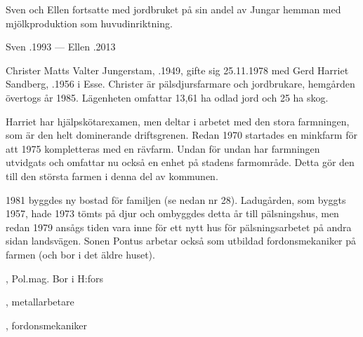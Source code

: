 Sven och Ellen fortsatte med jordbruket på sin andel av Jungar hemman med mjölkproduktion som huvudinriktning.
\begin{jhchildren}
  \item {}
  \item {}
  \item {}
\end{jhchildren}

Sven .1993  ---  Ellen .2013



%

%
Christer Matts Valter Jungerstam, .1949, gifte sig 25.11.1978 med Gerd Harriet Sandberg, .1956 i Esse. Christer är pälsdjursfarmare och jordbrukare, hemgården övertogs år 1985. Lägenheten omfattar 13,61 ha odlad jord och 25 ha skog.

Harriet har hjälpskötarexamen, men deltar i arbetet med den stora farmningen, som är den helt dominerande driftsgrenen. Redan 1970 startades en minkfarm för att 1975 kompletteras med en rävfarm. Undan för undan har farmningen utvidgats och omfattar nu också en enhet på stadens farmområde. Detta gör den till den största farmen i denna del av kommunen.


1981 byggdes ny bostad för familjen (se nedan nr 28). Ladugården, som byggts 1957, hade 1973 tömts på djur och ombyggdes detta år till pälsningshus, men redan 1979 ansågs tiden vara inne för ett nytt hus för pälsningsarbetet på andra sidan landsvägen. Sonen Pontus arbetar också som utbildad fordonsmekaniker på farmen (och bor i det äldre huset).
\begin{jhchildren}
  \item {}, Pol.mag. Bor i H:fors
  \item {}, metallarbetare
  \item {}, fordonsmekaniker
\end{jhchildren}


